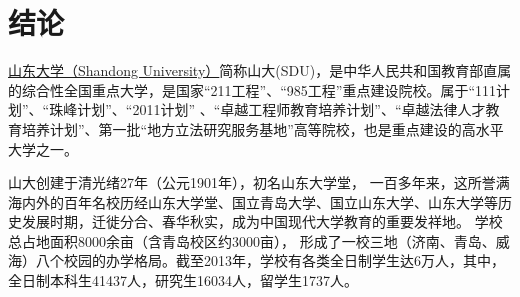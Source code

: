 


\chapter*{结\quad 论}

\href{http://www.sdu.edu.cn/}{山东大学（Shandong University）}简称山大(SDU)，是中华人民共和国教育部直属的综合性全国重点大学，是国家“211工程”、“985工程”重点建设院校。属于“111计划”、“珠峰计划”、“2011计划”  、“卓越工程师教育培养计划”、“卓越法律人才教育培养计划”、第一批“地方立法研究服务基地”高等院校，也是重点建设的高水平大学之一。


山大创建于清光绪27年（公元1901年），初名山东大学堂， 一百多年来，这所誉满海内外的百年名校历经山东大学堂、国立青岛大学、国立山东大学、山东大学等历史发展时期，迁徙分合、春华秋实，成为中国现代大学教育的重要发祥地。 学校总占地面积8000余亩（含青岛校区约3000亩）， 形成了一校三地（济南、青岛、威海）八个校园的办学格局。截至2013年，学校有各类全日制学生达6万人，其中，全日制本科生41437人，研究生16034人，留学生1737人。
